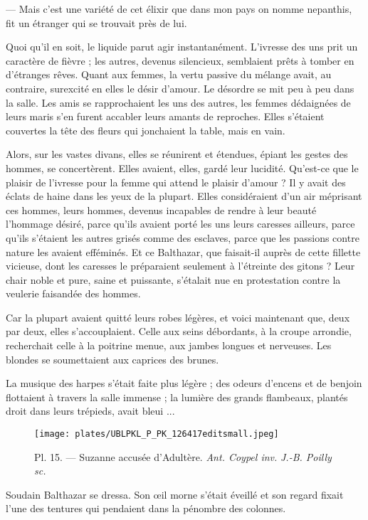 \documentclass[a4paper, 11pt, oneside, polutonikogreek, french]{article}
\begin{document}
--- Mais c'est une variété de cet élixir que dans mon pays on nomme nepanthis, fit un étranger qui se trouvait près de lui.

\bigskip
\centerline{\EightStarTaper}
\centerline{\EightStarTaper\EightStarTaper}
\bigskip

Quoi qu'il en soit, le liquide parut agir instantanément. L'ivresse des uns prit un caractère de fièvre ; les autres, devenus silencieux, semblaient prêts à tomber en d'étranges rêves. Quant aux femmes, la vertu passive du mélange avait, au contraire, surexcité en elles le désir d'amour. Le désordre se mit peu à peu dans la salle. Les amis se rapprochaient les uns des autres, les femmes dédaignées de leurs maris s'en furent accabler leurs amants de reproches. Elles s'étaient couvertes la tête des fleurs qui jonchaient la table, mais en vain.

Alors, sur les vastes divans, elles se réunirent et étendues, épiant les gestes des hommes, se concertèrent. Elles avaient, elles, gardé leur lucidité. Qu'est-ce que le plaisir de l'ivresse pour la femme qui attend le plaisir d'amour ? Il y avait des éclats de haine dans les yeux de la plupart. Elles considéraient d'un air méprisant ces hommes, leurs hommes, devenus incapables de rendre à leur beauté l'hommage désiré, parce qu'ils avaient porté les uns leurs caresses ailleurs, parce qu'ils s'étaient les autres grisés comme des esclaves, parce que les passions contre nature les avaient efféminés. Et ce Balthazar, que faisait-il auprès de cette fillette vicieuse, dont les caresses le préparaient seulement à l'étreinte des gitons ? Leur chair noble et pure, saine et puissante, s'étalait nue en protestation contre la veulerie faisandée des hommes.

Car la plupart avaient quitté leurs robes légères, et voici maintenant que, deux par deux, elles s'accouplaient. Celle aux seins débordants, à la croupe arrondie, recherchait celle à la poitrine menue, aux jambes longues et nerveuses. Les blondes se soumettaient aux caprices des brunes.

La musique des harpes s'était faite plus légère ; des odeurs d'encens et de benjoin flottaient à travers la salle immense ; la lumière des grands flambeaux, plantés droit dans leurs trépieds, avait bleui ...

\bigskip
\centerline{\EightStarTaper}
\centerline{\EightStarTaper\EightStarTaper}
\bigskip
\clearpage
\begin{landscape}
\begin{figure}[H]
\centering
\texttt{[image: plates/UBLPKL\_P\_PK\_126417editsmall.jpeg]}
\caption{Pl. 15. --- Suzanne accusée d'Adultère. \emph{Ant. Coypel inv.} \emph{J.-B. Poilly sc.}}
\end{figure}
\end{landscape}
\clearpage
Soudain Balthazar se dressa. Son œil morne s'était éveillé et son regard fixait l'une des tentures qui pendaient dans la pénombre des colonnes.
\end{document}
